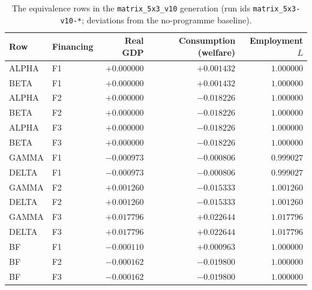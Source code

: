 \documentclass[11pt]{article}
\numberwithin{equation}{section}
\begin{document}
\begin{table}[htbp]
\centering
\caption{The equivalence rows in the \textcolor{revisionV3}{\texttt{matrix\_5x3\_v10}} generation
(run ids \textcolor{revisionV3}{\texttt{matrix\_5x3-v10-*}}; deviations from the no-programme
baseline).}
\label{tab:matrix}
\begin{tabular}{llrrr}
\toprule
Row & Financing & Real GDP & Consumption (welfare) & Employment $L$ \\
\midrule
ALPHA & F1 & $+0.000000$ & $+0.001432$ & $1.000000$ \\
BETA  & F1 & $+0.000000$ & $+0.001432$ & $1.000000$ \\
ALPHA & F2 & $+0.000000$ & $-0.018226$ & $1.000000$ \\
BETA  & F2 & $+0.000000$ & $-0.018226$ & $1.000000$ \\
ALPHA & F3 & $+0.000000$ & $-0.018226$ & $1.000000$ \\
BETA  & F3 & $+0.000000$ & $-0.018226$ & $1.000000$ \\
\midrule
GAMMA & F1 & $-0.000973$ & $-0.000806$ & $0.999027$ \\
DELTA & F1 & $-0.000973$ & $-0.000806$ & $0.999027$ \\
GAMMA & F2 & $+0.001260$ & $-0.015333$ & $1.001260$ \\
DELTA & F2 & $+0.001260$ & $-0.015333$ & $1.001260$ \\
GAMMA & F3 & $+0.017796$ & $+0.022644$ & $1.017796$ \\
DELTA & F3 & $+0.017796$ & $+0.022644$ & $1.017796$ \\
\midrule
BF & F1 & $-0.000110$ & $+0.000963$ & $1.000000$ \\
BF & F2 & $-0.000162$ & $-0.019800$ & $1.000000$ \\
BF & F3 & $-0.000162$ & $-0.019800$ & $1.000000$ \\
\bottomrule
\end{tabular}
\end{table}
\end{document}
